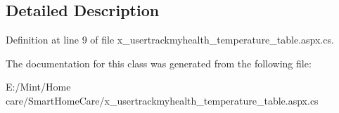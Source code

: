 \subsection{Detailed Description}


Definition at line 9 of file x\-\_\-usertrackmyhealth\-\_\-temperature\-\_\-table.\-aspx.\-cs.



The documentation for this class was generated from the following file\-:\begin{DoxyCompactItemize}
\item 
E\-:/\-Mint/\-Home care/\-Smart\-Home\-Care/x\-\_\-usertrackmyhealth\-\_\-temperature\-\_\-table.\-aspx.\-cs\end{DoxyCompactItemize}
